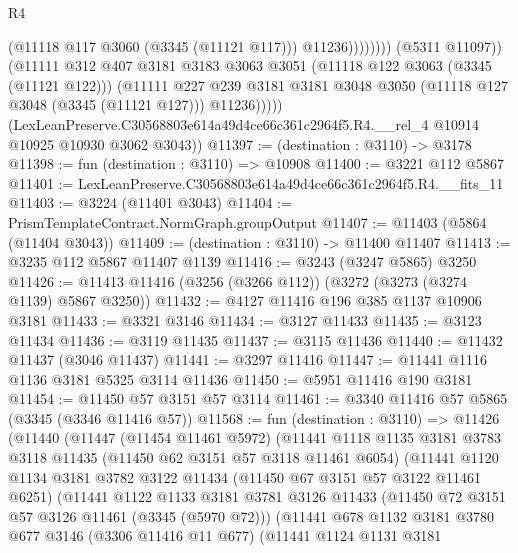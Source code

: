 \begin{lexlean}{R4}
\begin{coremodule}
                              (@11118 @117 @3060 (@3345 (@11121 @117)))
                              @11236))))))))
              (@5311 @11097))
            (@11111
              @312
              @407
              @3181
              @3183
              @3063
              @3051
              (@11118 @122 @3063 (@3345 (@11121 @122)))
              (@11111
                @227
                @239
                @3181
                @3181
                @3048
                @3050
                (@11118 @127 @3048 (@3345 (@11121 @127)))
                @11236)))))
      (LexLeanPreserve.C30568803e614a49d4ce66c361c2964f5.R4.__rel_4
        @10914
        @10925
        @10930
        @3062
        @3043))
@11397 := (destination : @3110) -> @3178
@11398 := fun (destination : @3110) => @10908
@11400 := @3221 @112 @5867
@11401 := LexLeanPreserve.C30568803e614a49d4ce66c361c2964f5.R4.__fits_11
@11403 := @3224 (@11401 @3043)
@11404 := PrismTemplateContract.NormGraph.groupOutput
@11407 := @11403 (@5864 (@11404 @3043))
@11409 := (destination : @3110) -> @11400 @11407
@11413 := @3235 @112 @5867 @11407 @1139
@11416 := @3243 (@3247 @5865) @3250
@11426 := @11413 @11416 (@3256 (@3266 @112)) (@3272 (@3273 (@3274 @1139) @5867 @3250))
@11432 := @4127 @11416 @196 @385 @1137 @10906 @3181
@11433 := @3321 @3146
@11434 := @3127 @11433
@11435 := @3123 @11434
@11436 := @3119 @11435
@11437 := @3115 @11436
@11440 := @11432 @11437 (@3046 @11437)
@11441 := @3297 @11416
@11447 := @11441 @1116 @1136 @3181 @5325 @3114 @11436
@11450 := @5951 @11416 @190 @3181
@11454 := @11450 @57 @3151 @57 @3114
@11461 := @3340 @11416 @57 @5865 (@3345 (@3346 @11416 @57))
@11568 := fun (destination : @3110) =>
  @11426
    (@11440
      (@11447
        (@11454 @11461 @5972)
        (@11441
          @1118
          @1135
          @3181
          @3783
          @3118
          @11435
          (@11450 @62 @3151 @57 @3118 @11461 @6054)
          (@11441
            @1120
            @1134
            @3181
            @3782
            @3122
            @11434
            (@11450 @67 @3151 @57 @3122 @11461 @6251)
            (@11441
              @1122
              @1133
              @3181
              @3781
              @3126
              @11433
              (@11450 @72 @3151 @57 @3126 @11461 (@3345 (@5970 @72)))
              (@11441
                @678
                @1132
                @3181
                @3780
                @677
                @3146
                (@3306 @11416 @11 @677)
                (@11441
                  @1124
                  @1131
                  @3181

\end{coremodule}
\end{lexlean}
